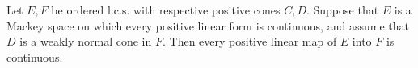 Let $E, F$ be ordered l.c.s. with respective positive cones $C, D$. Suppose that $E$ is a Mackey space on which every positive linear form is continuous, and assume that $D$ is a weakly normal cone in $F$. Then every positive linear map of $E$ into $F$ is continuous.
